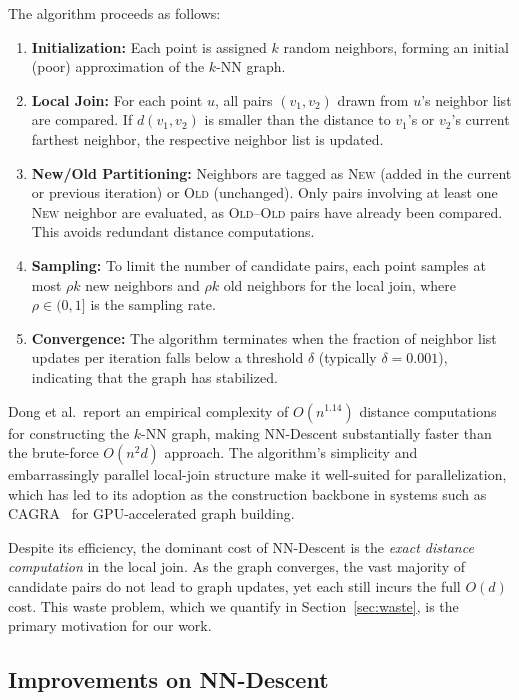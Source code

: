 The algorithm proceeds as follows:
\begin{enumerate}
    \item \textbf{Initialization:} Each point is assigned $k$ random neighbors, forming an initial (poor) approximation of the $k$-NN graph.
    \item \textbf{Local Join:} For each point $u$, all pairs $(v_1, v_2)$ drawn from $u$'s neighbor list are compared. If $d(v_1, v_2)$ is smaller than the distance to $v_1$'s or $v_2$'s current farthest neighbor, the respective neighbor list is updated.
    \item \textbf{New/Old Partitioning:} Neighbors are tagged as \textsc{New} (added in the current or previous iteration) or \textsc{Old} (unchanged). Only pairs involving at least one \textsc{New} neighbor are evaluated, as \textsc{Old}--\textsc{Old} pairs have already been compared. This avoids redundant distance computations.
    \item \textbf{Sampling:} To limit the number of candidate pairs, each point samples at most $\rho k$ new neighbors and $\rho k$ old neighbors for the local join, where $\rho \in (0, 1]$ is the sampling rate.
    \item \textbf{Convergence:} The algorithm terminates when the fraction of neighbor list updates per iteration falls below a threshold $\delta$ (typically $\delta = 0.001$), indicating that the graph has stabilized.
\end{enumerate}

Dong et al.\ report an empirical complexity of $O(n^{1.14})$ distance computations for constructing the $k$-NN graph, making NN-Descent substantially faster than the brute-force $O(n^2 d)$ approach.
The algorithm's simplicity and embarrassingly parallel local-join structure make it well-suited for parallelization, which has led to its adoption as the construction backbone in systems such as CAGRA~\cite{ootomo2024} for GPU-accelerated graph building.

Despite its efficiency, the dominant cost of NN-Descent is the \emph{exact distance computation} in the local join.
As the graph converges, the vast majority of candidate pairs do not lead to graph updates, yet each still incurs the full $O(d)$ cost.
This waste problem, which we quantify in Section~\ref{sec:waste}, is the primary motivation for our work.

\subsection{Improvements on NN-Descent}
\label{sec:nndescent_improvements}

